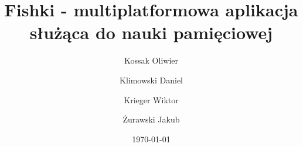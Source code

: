 \documentclass{sprz}
\title{Fishki - multiplatformowa aplikacja służąca do nauki pamięciowej}
\author{Kossak Oliwier}{s22018}{Sztuczna Inteligencja}{Niestacjonarny}
\author{Klimowski Daniel}{s18504}{Sztuczna Inteligencja}{Niestacjonarny}
\author{Krieger Wiktor}{s23638}{Sztuczna Inteligencja}{Niestacjonarny}
\author{Żurawski Jakub}{s23047}{Sztuczna Inteligencja}{Niestacjonarny}
\date{\today}
\begin{document}
    \maketitle

    \makeprojectcard
    \makedeclaration

    \tableofcontents

    

    

    

    

    

\end{document}
